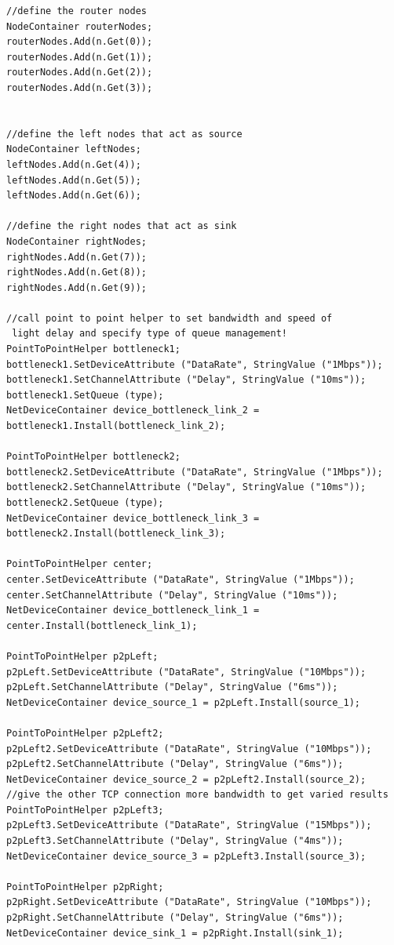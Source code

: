 \documentclass[paper=a4, fontsize=12pt]{scrartcl} %
\numberwithin{equation}{section} %
\numberwithin{figure}{section} %
\numberwithin{table}{section} %
\begin{document}
\begin{lstlisting}
//define the router nodes 
NodeContainer routerNodes;
routerNodes.Add(n.Get(0));
routerNodes.Add(n.Get(1));
routerNodes.Add(n.Get(2));
routerNodes.Add(n.Get(3));


//define the left nodes that act as source
NodeContainer leftNodes;
leftNodes.Add(n.Get(4));
leftNodes.Add(n.Get(5));
leftNodes.Add(n.Get(6));

//define the right nodes that act as sink
NodeContainer rightNodes;
rightNodes.Add(n.Get(7));
rightNodes.Add(n.Get(8));
rightNodes.Add(n.Get(9));

//call point to point helper to set bandwidth and speed of
 light delay and specify type of queue management!
PointToPointHelper bottleneck1;
bottleneck1.SetDeviceAttribute ("DataRate", StringValue ("1Mbps"));
bottleneck1.SetChannelAttribute ("Delay", StringValue ("10ms"));
bottleneck1.SetQueue (type);
NetDeviceContainer device_bottleneck_link_2 = bottleneck1.Install(bottleneck_link_2);

PointToPointHelper bottleneck2;
bottleneck2.SetDeviceAttribute ("DataRate", StringValue ("1Mbps"));
bottleneck2.SetChannelAttribute ("Delay", StringValue ("10ms"));
bottleneck2.SetQueue (type);
NetDeviceContainer device_bottleneck_link_3 = bottleneck2.Install(bottleneck_link_3);

PointToPointHelper center;
center.SetDeviceAttribute ("DataRate", StringValue ("1Mbps"));
center.SetChannelAttribute ("Delay", StringValue ("10ms"));
NetDeviceContainer device_bottleneck_link_1 = center.Install(bottleneck_link_1);

PointToPointHelper p2pLeft;
p2pLeft.SetDeviceAttribute ("DataRate", StringValue ("10Mbps"));
p2pLeft.SetChannelAttribute ("Delay", StringValue ("6ms"));
NetDeviceContainer device_source_1 = p2pLeft.Install(source_1);

PointToPointHelper p2pLeft2;
p2pLeft2.SetDeviceAttribute ("DataRate", StringValue ("10Mbps"));
p2pLeft2.SetChannelAttribute ("Delay", StringValue ("6ms"));
NetDeviceContainer device_source_2 = p2pLeft2.Install(source_2);
//give the other TCP connection more bandwidth to get varied results
PointToPointHelper p2pLeft3;
p2pLeft3.SetDeviceAttribute ("DataRate", StringValue ("15Mbps"));
p2pLeft3.SetChannelAttribute ("Delay", StringValue ("4ms"));
NetDeviceContainer device_source_3 = p2pLeft3.Install(source_3);

PointToPointHelper p2pRight;
p2pRight.SetDeviceAttribute ("DataRate", StringValue ("10Mbps"));
p2pRight.SetChannelAttribute ("Delay", StringValue ("6ms"));
NetDeviceContainer device_sink_1 = p2pRight.Install(sink_1);


\end{lstlisting}
\end{document}

